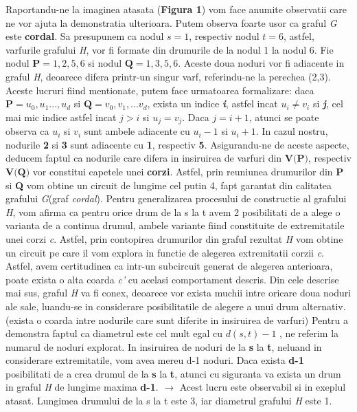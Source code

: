 \documentclass{article}
\begin{document}
Raportandu-ne la imaginea atasata  (\textbf{Figura 1}) vom face anumite observatii care ne vor ajuta la demonstratia ulterioara. Putem observa foarte usor ca graful \textit{G} este \textbf{cordal}. Sa presupunem ca nodul $\textit{s}=1$, respectiv nodul $\textit{t}=6$, astfel, varfurile grafului \textit{H}, vor fi formate din drumurile de la nodul 1 la nodul 6. Fie nodul $\textbf{P}=1, 2, 5, 6$ si nodul $\textbf{Q}=1, 3, 5, 6$. Aceste doua noduri vor fi adiacente in graful \textit{H}, deoarece difera printr-un singur varf, referindu-ne la perechea (2,3). Aceste lucruri fiind mentionate, putem face urmatoarea formalizare: daca $\textbf{P}=u_0, u_1..., u_d$ si $\textbf{Q}=v_0, v_1, ... v_d$, exista un indice \textbf{\textit{i}}, astfel incat $u_i \neq v_i$ si \textit{\textbf{j}}, cel mai mic indice astfel incat $j>i$ si $u_j=v_j$. Daca $j=i+1$, atunci se poate observa ca $u_i$ si $v_i$ sunt ambele adiacente cu $u_i-1$ si $u_i+1$. In cazul nostru, nodurile \textbf{2} si \textbf{3} sunt adiacente cu \textbf{1}, respectiv \textbf{5}. 
\newline
\newline
Asigurandu-ne de aceste aspecte, deducem faptul ca nodurile care difera in insiruirea de varfuri din $\textbf{V(P)}$, respectiv $\textbf{V(Q)}$ vor constitui capetele unei \textbf{corzi}. Astfel, prin reuniunea drumurilor din \textbf{P} si \textbf{Q} vom obtine un circuit de lungime cel putin 4, fapt garantat din calitatea grafului \textit{G}(graf \textit{cordal}). Pentru generalizarea procesului de constructie al grafului \textit{H}, vom afirma ca pentru orice drum de la s la t avem 2 posibilitati de a alege o varianta de a continua drumul, ambele variante fiind constituite de extremitatile unei corzi \textit{c}.
\newline
\newline
Astfel, prin contopirea drumurilor din graful rezultat \textit{H} vom obtine un circuit pe care il vom explora in functie de alegerea extremitatii corzii \textit{c}. Astfel, avem certitudinea ca intr-un subcircuit generat de alegerea anterioara, poate exista o alta coarda \textit{c'} cu acelasi comportament descris. 
\newline
\newline
Din cele descrise mai sus, graful \textit{H} va fi conex, deoarece vor exista muchii intre oricare doua noduri ale sale, luandu-se in considerare posibilitatile de alegere a unui drum alternativ.(exista o coarda intre nodurile care sunt diferite in insiruirea de varfuri)
\newline
\newline
Pentru a demonstra faptul ca diametrul este cel mult egal cu $d(s,t)-1$ , ne referim la numarul de noduri explorat. In insiruirea de noduri de la \textbf{s} la \textbf{t}, neluand in considerare extremitatile, vom avea mereu d-1 noduri. Daca exista \textbf{d-1} posibilitati de a crea drumul de la \textbf{s} la \textbf{t}, atunci cu siguranta va exista un drum in graful \textit{H} de lungime maxima \textbf{d-1}.
\newline
\newline
$\rightarrow$ Acest lucru este observabil si in exeplul atasat. Lungimea drumului de la s la t este 3, iar diametrul grafului \textit{H} este 1.
\end{document}
